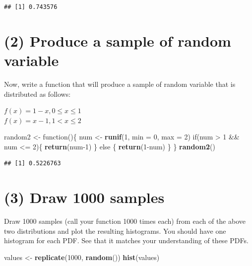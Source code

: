 \documentclass[]{article}
\newenvironment{Shaded}{\begin{snugshade}}{\end{snugshade}}
\newcommand{\KeywordTok}[1]{\textcolor[rgb]{0.13,0.29,0.53}{\textbf{{#1}}}}
\newcommand{\DataTypeTok}[1]{\textcolor[rgb]{0.13,0.29,0.53}{{#1}}}
\newcommand{\DecValTok}[1]{\textcolor[rgb]{0.00,0.00,0.81}{{#1}}}
\newcommand{\StringTok}[1]{\textcolor[rgb]{0.31,0.60,0.02}{{#1}}}
\newcommand{\NormalTok}[1]{{#1}}
\begin{document}
\begin{verbatim}
## [1] 0.743576
\end{verbatim}

\section{(2) Produce a sample of random
variable}\label{produce-a-sample-of-random-variable-1}

Now, write a function that will produce a sample of random variable that
is distributed as follows:

\(f(x) = 1 - x, 0 \leq x \leq 1\)\\
\(f(x) = x - 1, 1 < x \leq 2\)

\begin{Shaded}
\begin{Highlighting}[]
\NormalTok{random2 <-}\StringTok{ }\NormalTok{function()\{}
          \NormalTok{num <-}\StringTok{ }\KeywordTok{runif}\NormalTok{(}\DecValTok{1}\NormalTok{, }\DataTypeTok{min =} \DecValTok{0}\NormalTok{, }\DataTypeTok{max =} \DecValTok{2}\NormalTok{) }
          \NormalTok{if(num >}\StringTok{ }\DecValTok{1} \NormalTok{&&}\StringTok{ }\NormalTok{num <=}\StringTok{ }\DecValTok{2}\NormalTok{)\{}
             \KeywordTok{return}\NormalTok{(num}\DecValTok{-1}\NormalTok{)}
            \NormalTok{\} else \{}
              \KeywordTok{return}\NormalTok{(}\DecValTok{1}\NormalTok{-num)}
            \NormalTok{\}}
          \NormalTok{\} }
\KeywordTok{random2}\NormalTok{()}
\end{Highlighting}
\end{Shaded}

\begin{verbatim}
## [1] 0.5226763
\end{verbatim}

\section{(3) Draw 1000 samples}\label{draw-1000-samples}

Draw 1000 samples (call your function 1000 times each) from each of the
above two distributions and plot the resulting histograms. You should
have one histogram for each PDF. See that it matches your understanding
of these PDFs.

\begin{Shaded}
\begin{Highlighting}[]
\NormalTok{values <-}\StringTok{ }\KeywordTok{replicate}\NormalTok{(}\DecValTok{1000}\NormalTok{, }\KeywordTok{random}\NormalTok{())}
\KeywordTok{hist}\NormalTok{(values)}
\end{Highlighting}
\end{Shaded}
\end{document}
